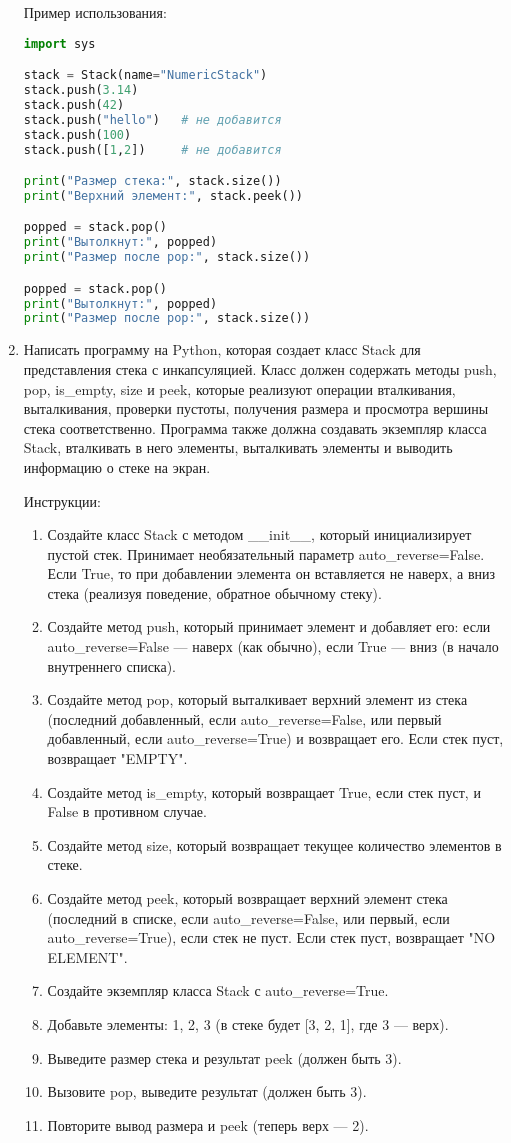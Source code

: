 \begin{enumerate}
Пример использования:
\begin{lstlisting}[language=Python]
import sys

stack = Stack(name="NumericStack")
stack.push(3.14)
stack.push(42)
stack.push("hello")   # не добавится
stack.push(100)
stack.push([1,2])     # не добавится

print("Размер стека:", stack.size())
print("Верхний элемент:", stack.peek())

popped = stack.pop()
print("Вытолкнут:", popped)
print("Размер после pop:", stack.size())

popped = stack.pop()
print("Вытолкнут:", popped)
print("Размер после pop:", stack.size())
\end{lstlisting}

\item Написать программу на Python, которая создает класс Stack для представления стека с инкапсуляцией. Класс должен содержать методы push, pop, is\_empty, size и peek, которые реализуют операции вталкивания, выталкивания, проверки пустоты, получения размера и просмотра вершины стека соответственно. Программа также должна создавать экземпляр класса Stack, вталкивать в него элементы, выталкивать элементы и выводить информацию о стеке на экран.

Инструкции:
\begin{enumerate}
    \item Создайте класс Stack с методом \_\_init\_\_, который инициализирует пустой стек. Принимает необязательный параметр auto\_reverse=False. Если True, то при добавлении элемента он вставляется не наверх, а вниз стека (реализуя поведение, обратное обычному стеку).
    \item Создайте метод push, который принимает элемент и добавляет его: если auto\_reverse=False — наверх (как обычно), если True — вниз (в начало внутреннего списка).
    \item Создайте метод pop, который выталкивает верхний элемент из стека (последний добавленный, если auto\_reverse=False, или первый добавленный, если auto\_reverse=True) и возвращает его. Если стек пуст, возвращает "EMPTY".
    \item Создайте метод is\_empty, который возвращает True, если стек пуст, и False в противном случае.
    \item Создайте метод size, который возвращает текущее количество элементов в стеке.
    \item Создайте метод peek, который возвращает верхний элемент стека (последний в списке, если auto\_reverse=False, или первый, если auto\_reverse=True), если стек не пуст. Если стек пуст, возвращает "NO ELEMENT".
    \item Создайте экземпляр класса Stack с auto\_reverse=True.
    \item Добавьте элементы: 1, 2, 3 (в стеке будет [3, 2, 1], где 3 — верх).
    \item Выведите размер стека и результат peek (должен быть 3).
    \item Вызовите pop, выведите результат (должен быть 3).
    \item Повторите вывод размера и peek (теперь верх — 2).
\end{enumerate}


\end{enumerate}
